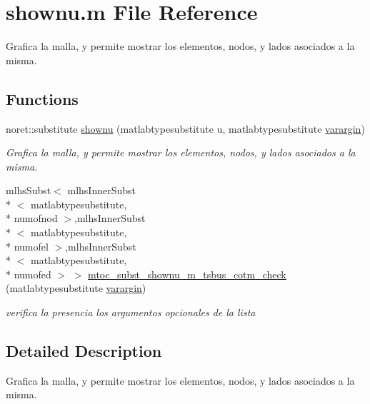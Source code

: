 \hypertarget{a00031}{\section{shownu.\-m File Reference}
\label{a00031}
}


Grafica la malla, y permite mostrar los elementos, nodos, y lados asociados a la misma.  


\subsection*{Functions}
\begin{DoxyCompactItemize}
\item 
noret\-::substitute \hyperlink{a00031_a5a6dfdfa880a93bff6a4798279a0a8e6}{shownu} (matlabtypesubstitute u, matlabtypesubstitute \hyperlink{a00014}{varargin})
\begin{DoxyCompactList}\small\item\em Grafica la malla, y permite mostrar los elementos, nodos, y lados asociados a la misma. \end{DoxyCompactList}\item 
mlhs\-Subst$<$ mlhs\-Inner\-Subst\\*
$<$ matlabtypesubstitute, \\*
numofnod $>$,mlhs\-Inner\-Subst\\*
$<$ matlabtypesubstitute, \\*
numofel $>$,mlhs\-Inner\-Subst\\*
$<$ matlabtypesubstitute, \\*
numofed $>$ $>$ \hyperlink{a00031_a7f9f7ccd03613cb0060385a015b085b5}{mtoc\-\_\-subst\-\_\-shownu\-\_\-m\-\_\-tsbus\-\_\-cotm\-\_\-check} (matlabtypesubstitute \hyperlink{a00014}{varargin})
\begin{DoxyCompactList}\small\item\em verifica la presencia los argumentos opcionales de la lista \end{DoxyCompactList}\end{DoxyCompactItemize}


\subsection{Detailed Description}
Grafica la malla, y permite mostrar los elementos, nodos, y lados asociados a la misma. 

